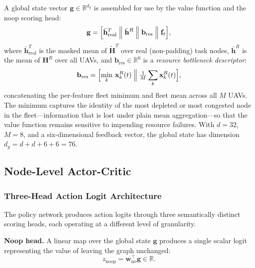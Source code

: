 A global state vector $\mathbf{g} \in \mathbb{R}^{d_g}$
is assembled for use by the value function and the noop scoring head:
\begin{equation}
  \mathbf{g} = \Bigl[
    \bar{\mathbf{h}}^T_{\mathrm{real}}\;\Big\|\;
    \bar{\mathbf{h}}^R\;\Big\|\;
    \mathbf{b}_{\mathrm{res}}\;\Big\|\;
    \mathbf{f}_t
  \Bigr],
  \label{eq:global}
\end{equation}
where $\bar{\mathbf{h}}^T_{\mathrm{real}}$ is the masked mean of
$\tilde{\mathbf{H}}^T$ over real (non-padding) task nodes,
$\bar{\mathbf{h}}^R$ is the mean of $\mathbf{H}^R$ over all UAVs,
and $\mathbf{b}_{\mathrm{res}} \in \mathbb{R}^6$ is a
\textit{resource bottleneck descriptor}:
\begin{equation}
  \mathbf{b}_{\mathrm{res}} =
  \Bigl[
    \min_{k}\,\mathbf{x}_k^R(t)\;\Big\|\;
    \tfrac{1}{M}\sum_k \mathbf{x}_k^R(t)
  \Bigr],
  \label{eq:bottleneck}
\end{equation}
concatenating the per-feature fleet minimum and fleet mean across
all $M$ UAVs.
The minimum captures the identity of the most depleted or
most congested node in the fleet—information that is lost under
plain mean aggregation—so that the value function remains
sensitive to impending resource failures.
With $d = 32$, $M = 8$, and a six-dimensional feedback vector,
the global state has dimension
$d_g = d + d + 6 + 6 = 76$.

\subsection{Node-Level Actor-Critic}
\label{subsec:actor}

\subsubsection*{Three-Head Action Logit Architecture}

The policy network produces action logits through three
semantically distinct scoring heads, each operating at a
different level of granularity.

\noindent\textbf{Noop head.}
A linear map over the global state $\mathbf{g}$ produces a single
scalar logit representing the value of leaving the graph unchanged:
\begin{equation}
  z_{\mathrm{noop}} = \mathbf{w}_{\mathrm{no}}^\top \mathbf{g}
    \in \mathbb{R}.
  \label{eq:z_noop}
\end{equation}

